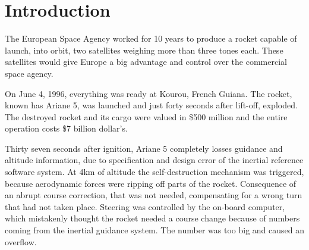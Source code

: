 \documentclass[
12pt, %
a4paper, %
oneside, %
headinclude,footinclude, %
BCOR5mm, %
]{scrartcl}
\begin{document}



\let\thefootnote\relax{}
\let\thefootnote\relax{}
\let\thefootnote\relax{}


\newpage %


\section{Introduction}

The European Space Agency worked for 10 years to produce a rocket capable of launch, into orbit, two satellites weighing more than three tones each. These satellites would give Europe a big advantage and control over the commercial space agency. 

On June 4, 1996, everything was ready at Kourou, French Guiana. The rocket, known has Ariane 5, was launched and just forty seconds after lift-off, exploded.
The destroyed rocket and its cargo were valued in \$500 million and the entire operation costs \$7 billion dollar's.

Thirty seven seconds after ignition, Ariane 5 completely losses guidance and altitude information, due to specification and design error of the inertial reference software system. At 4km of altitude the self-destruction mechanism was triggered, because aerodynamic forces were ripping off parts of the rocket. Consequence of an abrupt course correction, that was not needed, compensating for a wrong turn that had not taken place. Steering was controlled by the on-board computer, which mistakenly thought the rocket needed a course change because of numbers coming from the inertial guidance system. The number was too big and caused an overflow.
\end{document}
